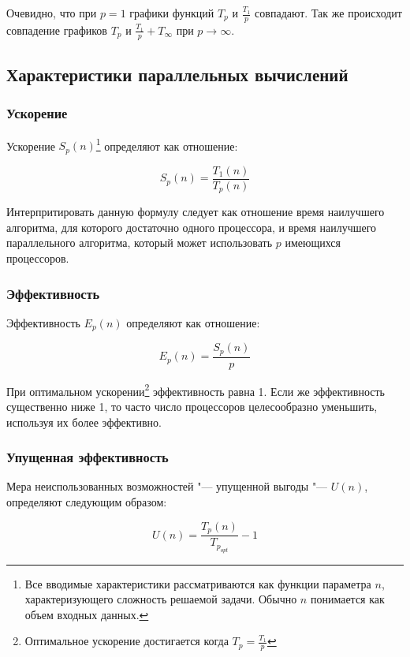 \documentclass{article}
\begin{document}
			Очевидно, что при $p = 1$ графики функций $T_p$ и $\frac{T_1}{p}$ совпадают. Так же происходит совпадение графиков 				$T_p$ и $\frac{T_1}{p}+T_\infty$ при $p\to\infty$.
		\newpage
		\subsection{Характеристики параллельных вычислений}
			\subsubsection{Ускорение}
				Ускорение $S_p(n)$\footnote{Все вводимые характеристики рассматриваются как функции параметра $n$, 								характеризующего сложность решаемой задачи. Обычно $n$ понимается как объем входных данных.} определяют как 						отношение:
				
			\begin{equation}
				\label{eq:acceleration}
				S_p(n) = \frac{T_1(n)}{T_p(n)}
			\end{equation}			
				
				Интерпритировать данную формулу следует как отношение время наилучшего алгоритма, для которого достаточно одного 				процессора, и время наилучшего параллельного алгоритма, который может использовать $p$ имеющихся процессоров.				
				
			\subsubsection{Эффективность}
				Эффективность $E_p(n)$ определяют как отношение:
				
			\begin{equation}
				\label{eq:efficiency}
				E_p(n) = \frac{S_p(n)}{p}
			\end{equation}	

				При оптимальном ускорении\footnote{Оптимальное ускорение достигается когда $T_p = \frac{T_1}{p}$} эффективность 				равна 1. Если же эффективность существенно ниже 1, то часто число процессоров целесообразно уменьшить, используя 					их более эффективно. 
				
			\subsubsection{Упущенная эффективность}
				Мера неиспользованных возможностей "--- упущенной выгоды "--- $U(n)$, определяют следующим образом:
			
			\begin{equation}
				\label{eq:loss_of_efficiency}
				U(n) = \frac{T_p(n)}{T_{p_{opt}}} - 1
			\end{equation}
			
\end{document}
